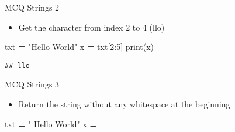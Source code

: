 \documentclass[
  8pt,
  ignorenonframetext,
]{beamer}
\newenvironment{Shaded}{\begin{snugshade}}{\end{snugshade}}
\newcommand{\BuiltInTok}[1]{#1}
\newcommand{\DecValTok}[1]{\textcolor[rgb]{0.00,0.00,0.81}{#1}}
\newcommand{\NormalTok}[1]{#1}
\newcommand{\OperatorTok}[1]{\textcolor[rgb]{0.81,0.36,0.00}{\textbf{#1}}}
\newcommand{\StringTok}[1]{\textcolor[rgb]{0.31,0.60,0.02}{#1}}
\providecommand{\tightlist}{%
  \setlength{\itemsep}{0pt}\setlength{\parskip}{0pt}}
\begin{document}
\begin{frame}[fragile]{MCQ Strings 2}
\protect\hypertarget{mcq-strings-2-1}{}
\begin{itemize}
\tightlist
\item
  Get the character from index 2 to 4 (llo)
\end{itemize}

\begin{Shaded}
\begin{Highlighting}[]
\NormalTok{txt }\OperatorTok{=} \StringTok{"Hello World"}
\NormalTok{x }\OperatorTok{=}\NormalTok{ txt[}\DecValTok{2}\NormalTok{:}\DecValTok{5}\NormalTok{]}
\BuiltInTok{print}\NormalTok{(x)}
\end{Highlighting}
\end{Shaded}

\begin{verbatim}
## llo
\end{verbatim}
\end{frame}

\begin{frame}[fragile]{MCQ Strings 3}
\protect\hypertarget{mcq-strings-3}{}
\begin{itemize}
\tightlist
\item
  Return the string without any whitespace at the beginning
\end{itemize}

\begin{Shaded}
\begin{Highlighting}[]
\NormalTok{txt }\OperatorTok{=} \StringTok{" Hello World"}
\NormalTok{x }\OperatorTok{=} 
\end{Highlighting}
\end{Shaded}
\end{frame}
\end{document}
